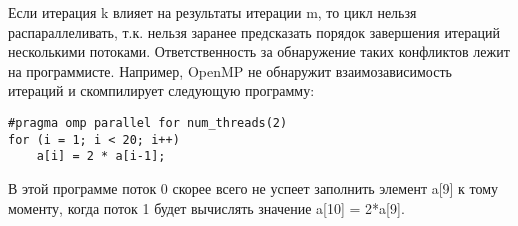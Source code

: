Если итерация k влияет на результаты итерации m, то цикл нельзя распараллеливать, т.к. нельзя заранее предсказать порядок завершения итераций несколькими потоками.  Ответственность за обнаружение таких конфликтов лежит на программисте. Например, OpenMP не обнаружит взаимозависимость итераций и скомпилирует следующую программу:

\begin{verbatim}
#pragma omp parallel for num_threads(2)
for (i = 1; i < 20; i++)
    a[i] = 2 * a[i-1];
\end{verbatim}

В этой программе поток 0 скорее всего не успеет заполнить элемент a[9] к тому моменту, когда поток 1 будет вычислять значение a[10] = 2*a[9].
